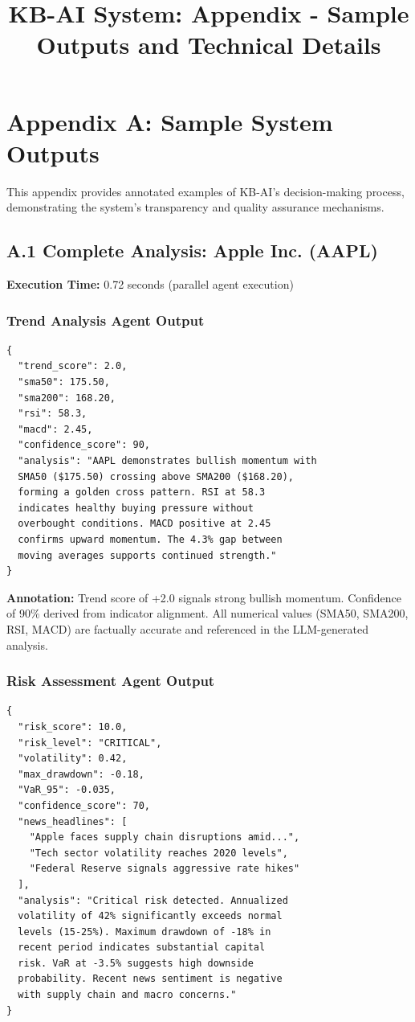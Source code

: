 \documentclass[11pt,letterpaper]{article}
\title{KB-AI System: Appendix - Sample Outputs and Technical Details}
\begin{document}
\maketitle

\section*{Appendix A: Sample System Outputs}

This appendix provides annotated examples of KB-AI's decision-making process, demonstrating the system's transparency and quality assurance mechanisms.

\subsection*{A.1 Complete Analysis: Apple Inc. (AAPL)}

\textbf{Execution Time:} 0.72 seconds (parallel agent execution)

\subsubsection*{Trend Analysis Agent Output}

\begin{lstlisting}[caption={Trend Agent Response}]
{
  "trend_score": 2.0,
  "sma50": 175.50,
  "sma200": 168.20,
  "rsi": 58.3,
  "macd": 2.45,
  "confidence_score": 90,
  "analysis": "AAPL demonstrates bullish momentum with 
  SMA50 ($175.50) crossing above SMA200 ($168.20), 
  forming a golden cross pattern. RSI at 58.3 
  indicates healthy buying pressure without 
  overbought conditions. MACD positive at 2.45 
  confirms upward momentum. The 4.3% gap between 
  moving averages supports continued strength."
}
\end{lstlisting}

\textbf{Annotation:} Trend score of +2.0 signals strong bullish momentum. Confidence of 90\% derived from indicator alignment. All numerical values (SMA50, SMA200, RSI, MACD) are factually accurate and referenced in the LLM-generated analysis.

\subsubsection*{Risk Assessment Agent Output}

\begin{lstlisting}[caption={Risk Agent Response}]
{
  "risk_score": 10.0,
  "risk_level": "CRITICAL",
  "volatility": 0.42,
  "max_drawdown": -0.18,
  "VaR_95": -0.035,
  "confidence_score": 70,
  "news_headlines": [
    "Apple faces supply chain disruptions amid...",
    "Tech sector volatility reaches 2020 levels",
    "Federal Reserve signals aggressive rate hikes"
  ],
  "analysis": "Critical risk detected. Annualized 
  volatility of 42% significantly exceeds normal 
  levels (15-25%). Maximum drawdown of -18% in 
  recent period indicates substantial capital 
  risk. VaR at -3.5% suggests high downside 
  probability. Recent news sentiment is negative 
  with supply chain and macro concerns."
}
\end{lstlisting}
\end{document}
